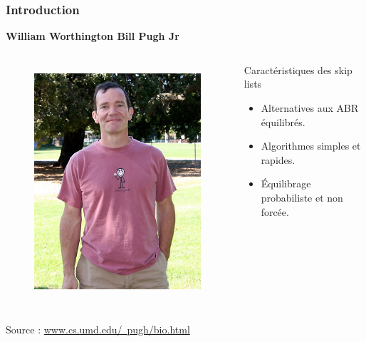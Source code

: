 \documentclass{beamer}
\begin{document}
\begin{frame}
	\frametitle{Introduction}
	
	\textbf{William Worthington Bill Pugh Jr} \\
	\begin{columns}		
		\begin{figure}
			\centering	
			\includegraphics[width=1\textwidth]{bill.jpg}	\\			
		\end{figure}
		
		
	
	\begin{block}{Caractéristiques des skip lists \cite{ArticlePugh}} 
		\begin{itemize}
			\item Alternatives aux ABR équilibrés.	\\[.6cm]
			\item Algorithmes simples et rapides.  \\[.6cm]
			\item Équilibrage probabiliste et non forcée.

		\end{itemize}
	\end{block}	
	\end{columns}
	\begin{flushleft}
		{Source : \href{www.cs.umd.edu/~pugh/bio.html}{www.cs.umd.edu/~pugh/bio.html} 	}
	\end{flushleft}	
	
\end{frame}
\end{document}
